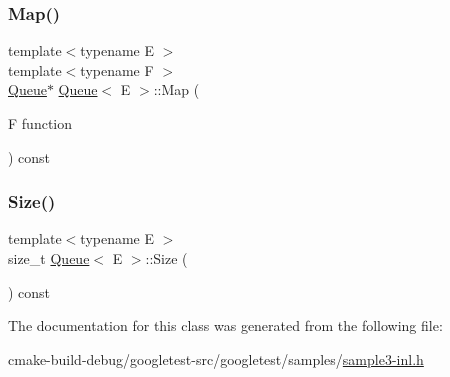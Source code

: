 \mbox{\label{classQueue_a904a696292fc593adc6fd21fb229d760}} 
\subsubsection{\texorpdfstring{Map()}{Map()}}
{\footnotesize\ttfamily template$<$typename E $>$ \\
template$<$typename F $>$ \\
\mbox{\hyperlink{classQueue}{Queue}}$\ast$ \mbox{\hyperlink{classQueue}{Queue}}$<$ E $>$\+::Map (\begin{DoxyParamCaption}\item[{F}]{function }\end{DoxyParamCaption}) const\hspace{0.3cm}{\ttfamily [inline]}}

\mbox{\label{classQueue_abc4d78b5f66041011c5590bf703847b0}} 
\subsubsection{\texorpdfstring{Size()}{Size()}}
{\footnotesize\ttfamily template$<$typename E $>$ \\
size\+\_\+t \mbox{\hyperlink{classQueue}{Queue}}$<$ E $>$\+::Size (\begin{DoxyParamCaption}{ }\end{DoxyParamCaption}) const\hspace{0.3cm}{\ttfamily [inline]}}



The documentation for this class was generated from the following file\+:\begin{DoxyCompactItemize}
\item 
cmake-\/build-\/debug/googletest-\/src/googletest/samples/\mbox{\hyperlink{sample3-inl_8h}{sample3-\/inl.\+h}}\end{DoxyCompactItemize}
